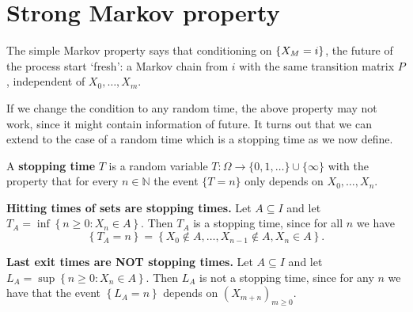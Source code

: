 \documentclass[a4paper,11pt]{article}
\begin{document}
\section{Strong Markov property}
The simple Markov property says that conditioning on $\qty{X_M=i}$, the future of the process start `fresh': a Markov chain from $i$ with the same transition matrix $P$, independent of $X_0,\dots,X_m$. 

If we change the condition to any random time, the above property may not work, since it might contain information of future. It turns out that we can extend to the case of a random time which is a stopping time as we now define.

\begin{definition}
    A \textbf{stopping time} $T$ is a random variable $T: \Omega \rightarrow\{0,1, \ldots\} \cup\{\infty\}$ with the property that for every $n \in \mathbb{N}$ the event $\{T=n\}$ only depends on $X_0, \ldots, X_n$.
\end{definition}

\begin{example}
\textbf{Hitting times of sets are stopping times.} Let $A \subseteq I$ and let $T_A=\inf \left\{n \geq 0: X_n \in A\right\}$. Then $T_A$ is a stopping time, since for all $n$ we have
\[
\left\{T_A=n\right\}=\left\{X_0 \notin A, \ldots, X_{n-1} \notin A, X_n \in A\right\} .
\]

\textbf{Last exit times are NOT stopping times.} Let $A \subseteq I$ and let $L_A=\sup \left\{n \geq 0: X_n \in A\right\}$. Then $L_A$ is not a stopping time, since for any $n$ we have that the event $\left\{L_A=n\right\}$ depends on $\left(X_{m+n}\right)_{m \geq 0}$.
\end{example}
\end{document}
